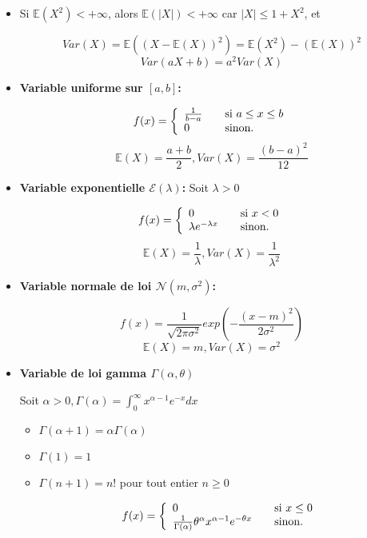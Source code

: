 \documentclass[10pt,a4paper,oneside]{article}
\begin{document}
\begin{itemize}
\item
Si $\mathbb{E}(X^2) < +\infty$, alors $\mathbb{E}(|X|) < +\infty$ car $|X| \leq 1 + X^2$, et

\[ Var(X) = \mathbb{E}((X - \mathbb{E}(X))^2) = \mathbb{E}(X^2) - (\mathbb{E}(X))^2 \]
\[ Var(aX + b) = a^2Var(X) \]

\item
\textbf{Variable uniforme sur $[a,b]$:}

\[ f(x) = \left\{ 
  \begin{array}{l l }
    \frac{1}{b - a} & \quad \text{si }a \leq x \leq b\\
    0 & \quad \text{sinon.}
  \end{array} \right.\]
\[ \mathbb{E}(X) = \frac{a + b}{2}, Var(X) = \frac{(b - a)^2}{12} \]

\item
\textbf{Variable exponentielle $\mathcal{E}(\lambda)$:} Soit $\lambda > 0$

\[ f(x) = \left\{ 
  \begin{array}{l l }
    0 & \quad \text{si }x < 0\\
    \lambda e^{-\lambda x} & \quad \text{sinon.}
  \end{array} \right.\]
\[ \mathbb{E}(X) = \frac{1}{\lambda}, Var(X) = \frac{1}{\lambda^2} \]

\item
\textbf{Variable normale de loi $\mathcal{N}(m,\sigma^2)$:}

\[ f(x) = \frac{1}{\sqrt{2 \pi \sigma^2}} exp(-\frac{(x - m)^2}{2 \sigma^2}) \]
\[ \mathbb{E}(X) = m, Var(X) = \sigma^2 \]

\item
\textbf{Variable de loi gamma $\Gamma(\alpha, \theta)$}

Soit $\alpha > 0, \Gamma(\alpha) = \int_{0}^{\infty} x^{\alpha - 1}e^{-x} dx$

\begin{itemize}
\item
$\Gamma(\alpha + 1) = \alpha \Gamma(\alpha)$
\item
$\Gamma(1) = 1$
\item
$\Gamma(n + 1) = n!$ pour tout entier $n \geq 0$

\[ f(x) = \left\{ 
  \begin{array}{l l }
    0 & \quad \text{si }x \leq 0\\
    \frac{1}{\Gamma(\alpha)} \theta^\alpha x^{\alpha - 1} e^{-\theta x} & \quad \text{sinon.}
  \end{array} \right.\]


\end{itemize}
\end{itemize}
\end{document}
